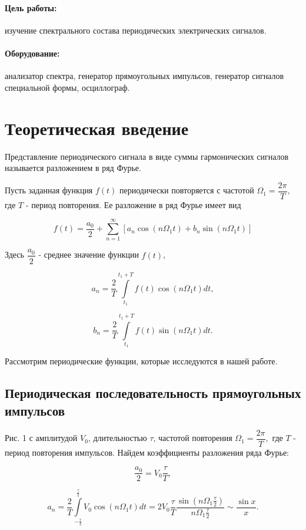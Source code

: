 





\paragraph*{Цель работы:} изучение спектрального состава периодических электрических сигналов.
	
\paragraph*{Оборудование:} анализатор спектра, генератор прямоугольных импульсов, генератор сигналов специальной формы, осциллограф.
	
\section{Теоретическая введение}
	
	Представление периодического сигнала в виде суммы гармонических сигналов называется разложением в ряд Фурье.
	
	Пусть заданная функция $f(t)$ периодически повторяется с частотой $\Omega_{1}=\dfrac{2\pi}{T},$ где $T$ - период повторения. Ее разложение в ряд Фурье имеет вид
	
	$$ f(t)=\dfrac{a_{0}}{2}+ \sum\limits_{n=1}^\infty [a_{n}\cos(n \Omega_{1}t)+b_{n}\sin(n \Omega_{1} t) ]$$
	
	Здесь $\dfrac{a_{0}}{2}$ - среднее значение функции $f(t)$,
	
	$$ a_{n}=\dfrac{2}{T}\int\limits_{t_{1}}^{t_{1}+T}f(t)\cos(n \Omega_{1} t)dt, $$
	
	$$ b_{n}=\dfrac{2}{T}\int\limits_{t_{1}}^{t_{1}+T}f(t)\sin(n \Omega_{1} t)dt. $$
	
	
	Рассмотрим периодические функции, которые исследуются в нашей
	работе.
	
		
	\subsection{Периодическая последовательность прямоугольных импульсов} 
	Рис. 1 с амплитудой $V_{0}$, длительностью $\tau$, частотой повторения $\Omega_{1}=\dfrac{2\pi}{T},$ где $T$ - период повторения импульсов. Найдем коэффициенты разложения ряда Фурье:
	
	$$\dfrac{a_{0}}{2}=V_{0}\dfrac{\tau}{T},$$
	
	$$a_{n}=\dfrac{2}{T}\int\limits_{-\frac{\tau}{2}}^{\frac{\tau}{2}}V_{0}\cos(n \Omega_{1} t)dt=2V_{0}\dfrac{\tau}{T}\dfrac{\sin(n \Omega_{1} \frac{\tau}{2})}{n\Omega_{1}\frac{\tau}{2}} \sim \dfrac{\sin x}{x}.$$
	
